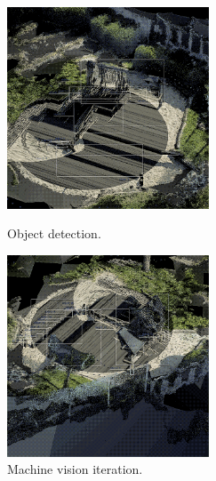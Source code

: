 \documentclass{article}
\newcommand\y{6}
\begin{document}
\begin{figure}[H]
  \captionsetup{font=small,justification=raggedright,singlelinecheck=false}
  \parbox{6cm}{
  \includegraphics[width=\y cm]{h.png}
  \caption{Object detection.}
  \label{fig:2figsA}}
  \qquad
  \begin{minipage}{6cm}
  \includegraphics[width=\y cm]{i.png}
  \caption{Machine vision iteration.}
  \label{fig:2figsB}
  \end{minipage}
\end{figure}
\end{document}
